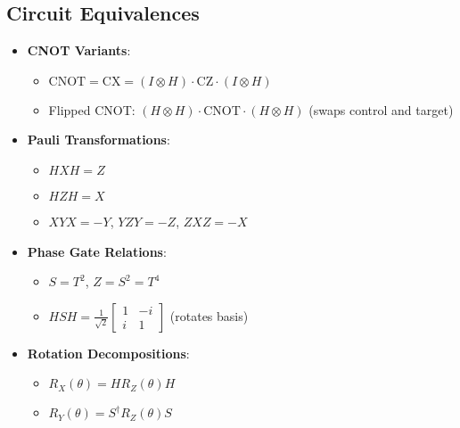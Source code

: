 \begin{multicols}{3}
                  \section*{Circuit Equivalences}
                  \begin{itemize}[leftmargin=*,nosep,topsep=0pt]
                    \item \textbf{CNOT Variants}:
                      \begin{itemize}[nosep]
                        \item $\text{CNOT} = \text{CX} = (I \otimes H) \cdot \text{CZ} \cdot (I \otimes H)$
                        \item Flipped CNOT: $(H \otimes H) \cdot \text{CNOT} \cdot (H \otimes H)$ (swaps control and target)
                      \end{itemize}
                    \item \textbf{Pauli Transformations}:
                      \begin{itemize}[nosep]
                        \item $H X H = Z$
                        \item $H Z H = X$
                        \item $X Y X = -Y$, $Y Z Y = -Z$, $Z X Z = -X$
                      \end{itemize}
                    \item \textbf{Phase Gate Relations}:
                      \begin{itemize}[nosep]
                        \item $S = T^2$, $Z = S^2 = T^4$
                        \item $H S H = \frac{1}{\sqrt{2}} \begin{bmatrix} 1 & -i \\ i & 1 \end{bmatrix}$ (rotates basis)
                      \end{itemize}
                    \item \textbf{Rotation Decompositions}:
                      \begin{itemize}[nosep]
                        \item $R_X(\theta) = H R_Z(\theta) H$
                        \item $R_Y(\theta) = S^\dagger R_Z(\theta) S$
                      \end{itemize}
                  \end{itemize}

                \end{multicols}
                \endgroup
